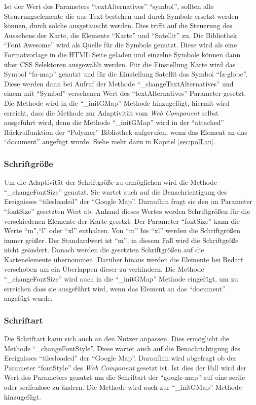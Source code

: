 \documentclass[12pt, paper=a4, bibtotoc, toc=listof, headsepline=true]{scrreprt}
\begin{document}
	\newline
	Ist der Wert des Parameters \enquote{textAlternatives} \enquote{symbol}, sollten alle Steuerungselemente die aus Text bestehen und durch Symbole ersetzt werden können, durch solche ausgetauscht werden. Dies trifft auf die Steuerung des Aussehens der Karte, die Elemente \enquote{Karte} und \enquote{Satellit} zu. Die Bibliothek \enquote{Font Awesome} wird als Quelle für die Symbole genutzt\cite{fonAwe}. Diese wird als eine Formatvorlage in die \ac{HTML} Seite geladen und einzelne Symbole können dann über \ac{CSS} Selektoren ausgewählt werden. Für die Einstellung Karte wird das Symbol \enquote{fa-map} genutzt und für die Einstellung Satellit das Symbol \enquote{fa-globe}. Diese werden dann bei Aufruf der Methode \enquote{\_changeTextAlternatives} und einem mit \enquote{Symbol} versehenen Wert des \enquote{textAlternatives} Parameter gesetzt. Die Methode wird in die \enquote{\_initGMap} Methode hinzugefügt, hiermit wird erreicht, dass die Methode zur Adaptivität vom \emph{Web Component} selbst ausgeführt wird, denn die Methode \enquote{\_initGMap} wird in der \enquote{attached} Rückruffunktion der \enquote{Polymer} Bibliothek aufgerufen, wenn das Element an das \enquote{document} angefügt wurde. Siehe mehr dazu in Kapitel \ref{sec:polLau}.
	\subsubsection{Schriftgröße}
	\label{sec:fontsize}
	Um die Adaptivität der Schriftgröße zu ermöglichen wird die Methode \enquote{\_changeFontSize} genutzt.  Sie wartet auch auf die Benachrichtigung des Ereignisses \enquote{tilesloaded} der \enquote{Google Map}. Daraufhin fragt sie den im Parameter \enquote{fontSize} gesetzten Wert ab. Anhand dieses Wertes werden Schriftgrößen für die verschiedenen Elemente der Karte gesetzt. Der Parameter \enquote{fontSize} kann die Werte \enquote{m},\enquote{l} oder \enquote{xl} enthalten. Von \enquote{m} bis \enquote{xl} werden die Schriftgrößen immer größer. Der Standardwert ist \enquote{m}, in diesem Fall wird die Schriftgröße nicht geändert. Danach werden die gesetzten Schriftgrößen auf die Kartenelemente übernommen. Darüber hinaus werden die Elemente bei Bedarf verschoben um ein Überlappen dieser zu verhindern. Die Methode \enquote{\_changeFontSize} wird auch in die \enquote{\_initGMap} Methode eingefügt, um zu erreichen dass sie ausgeführt wird, wenn das Element an das \enquote{document} angefügt wurde.
	\subsubsection{Schriftart}
	Die Schriftart kann sich auch an den Nutzer anpassen. Dies ermöglicht die Methode \enquote{\_changeFontStyle}. Diese wartet auch auf die Benachrichtigung des Ereignisses \enquote{tilesloaded} der \enquote{Google Map}. Daraufhin wird abgefragt ob der Parameter \enquote{fontStyle} des \emph{Web Component} gesetzt ist. Ist dies der Fall wird der Wert des Parameters genutzt um die Schriftart der \enquote{google-map} auf eine serife oder serifenlose zu ändern. Die Methode wird auch zur \enquote{\_initGMap} Methode hinzugefügt.
\end{document}
